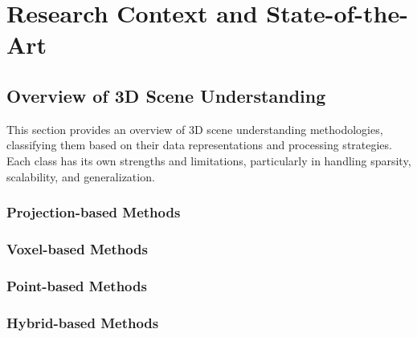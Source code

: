 
%

\chapter{Research Context and State-of-the-Art}\label{cha:sota}

\section{Overview of 3D Scene Understanding}
This section provides an overview of 3D scene understanding methodologies, classifying them based on their data representations and processing strategies. Each class has its own strengths and limitations, particularly in handling sparsity, scalability, and generalization.

\subsection{Projection-based Methods}

\subsection{Voxel-based Methods}

\subsection{Point-based Methods}

\subsection{Hybrid-based Methods}




